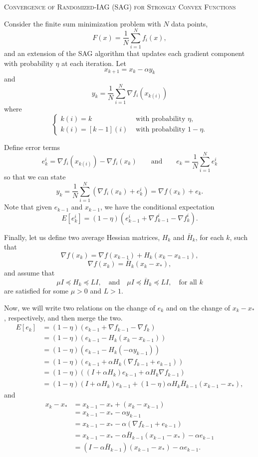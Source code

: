 \documentclass{article}
\begin{document}
\begin{center}
{\large \textsc{Convergence of Randomized-IAG (SAG) for Strongly Convex Functions}}
\end{center} 
 
\noindent 
Consider the finite sum minimization problem with $N$ data points, 
\[
 F(x) = \frac{1}{N}\sum_{i=1}^N f_i(x),
\]
and an extension of the SAG algorithm that updates each gradient component with probability $\eta$ at each iteration.  Let 
\[
 x_{k+1} = x_k -\alpha y_k
\]
and
\[
 y_k = \frac{1}{N}\sum_{i=1}^N \nabla f_i(x_{k(i)}) 
\]
where
\[
 \begin{cases}
  k(i) = k  & \mbox{ with probability }\eta,\\
  k(i) = [k-1](i) & \mbox{ with probability }1-\eta.
 \end{cases}
\]

\bigskip

\noindent
Define error terms 
\[
 e_k^i = \nabla f_i(x_{k(i)})-\nabla f_i(x_k) \qquad \mbox{and} \qquad e_k=\frac{1}{N}\sum_{i=1}^N e_k^i
\]
so that we can state 
\[
 y_k = \frac{1}{N}\sum_{i=1}^N (\nabla f_i(x_k)+e_k^i) = \nabla f(x_k) + e_k.
\]
Note that given $e_{k-1}$ and $x_{k-1}$, we have the conditional expectation 
\[
 E[e_k^i] = (1-\eta)(e_{k-1}^i + \nabla f_{k-1}^i - \nabla f_k^i).
\]

\bigskip
\noindent
Finally, let us define two average Hessian matrices, $H_k$ and $\bar H_k$, for each $k$, such that
\[
 \nabla f(x_k) = \nabla f(x_{k-1})+H_k(x_k-x_{k-1}),
\]
\[
 \nabla f(x_k) = \bar H_k(x_k-x_\ast),
\]
and assume that 
\[
  \mu I \preceq H_k \preceq L I , \quad \mbox{and} \quad \mu I \preceq \bar H_k \preceq L I,\quad \mbox{for all }k
\]
are satisfied for some $\mu>0$ and $L>1$.

\bigskip

\noindent 
Now, we will write two relations on the change of $e_k$ and on the change of $x_k-x_\ast$, respectively, and then merge the two.
 \begin{align*}
  E[e_k] &= (1-\eta)(e_{k-1} + \nabla f_{k-1} - \nabla f_k)\\
  &= (1-\eta)(e_{k-1} - H_k(x_k-x_{k-1}))\\
  &= (1-\eta)(e_{k-1} - H_k(-\alpha y_{k-1}))\\
  &= (1-\eta)\left(e_{k-1} + \alpha H_k (\nabla f_{k-1}+e_{k-1})\right)\\
  &= (1-\eta)\left((I+\alpha H_k)e_{k-1} + \alpha H_k\nabla f_{k-1}\right)\\ 
  &= (1-\eta)(I+\alpha H_k)e_{k-1} + (1-\eta)\alpha H_k\bar H_{k-1}(x_{k-1}-x_\ast),
 \end{align*}
and
 \begin{align*}
  x_k-x_\ast &= x_{k-1}-x_\ast + (x_k-x_{k-1})\\
  &=x_{k-1}-x_\ast -\alpha y_{k-1}\\
  &=x_{k-1}-x_\ast -\alpha (\nabla f_{k-1} + e_{k-1})\\
  &=x_{k-1}-x_\ast -\alpha\bar H_{k-1}(x_{k-1}-x_\ast) -\alpha e_{k-1}\\
  &=(I-\alpha\bar H_{k-1})(x_{k-1}-x_\ast) -\alpha e_{k-1}.
 \end{align*}
 
\end{document}
